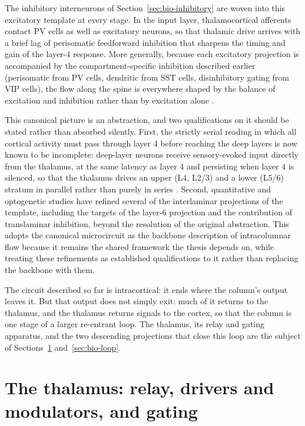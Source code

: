 The inhibitory interneurons of Section~\ref{sec:bio-inhibitory} are woven into this excitatory template at every stage. In the input 
layer, thalamocortical afferents contact PV cells as well as excitatory neurons, so that thalamic drive arrives with a brief lag of 
perisomatic feedforward inhibition that sharpens the timing and gain of the layer-4 response. More generally, because each excitatory 
projection is accompanied by the compartment-specific inhibition described earlier (perisomatic from PV cells, dendritic from SST cells, disinhibitory gating from VIP cells), the flow along the spine is everywhere shaped by the balance of excitation and inhibition rather 
 than by excitation alone \parencite{tremblay2016}.

This canonical picture is an abstraction, and two qualifications on it should be stated rather than absorbed silently. First, the 
strictly serial reading in which all cortical activity must pass through layer 4 before reaching the deep layers is now known to be 
incomplete: deep-layer neurons receive sensory-evoked input directly from the thalamus, at the same latency as layer 4 and persisting 
when layer 4 is silenced, so that the thalamus drives an upper (L4, L2/3) and a lower (L5/6) stratum in parallel rather than purely in 
series \parencite{constantinople2013}. Second, quantitative and optogenetic studies have refined several of the interlaminar projections
 of the template, including the targets of the layer-6 projection and the contribution of translaminar inhibition, beyond the resolution
  of the original abstraction. This \unitname{} adopts the canonical microcircuit as the backbone description of intracolumnar flow because 
  it remains the shared framework the thesis depends on, while treating these refinements as established qualifications to it rather 
  than replacing the backbone with them.

The circuit described so far is intracortical: it ends where the column's output leaves it. But that output does not simply exit: much of it returns to the thalamus, and the thalamus returns signals to the cortex, so that the column is one stage of a larger re-entrant 
 loop. The thalamus, its relay and gating apparatus, and the two descending projections that close this loop are the subject of 
 Sections~\ref{sec:bio-thalamus} and~\ref{sec:bio-loop}.
\section{The thalamus: relay, drivers and modulators, and gating}
\label{sec:bio-thalamus}


